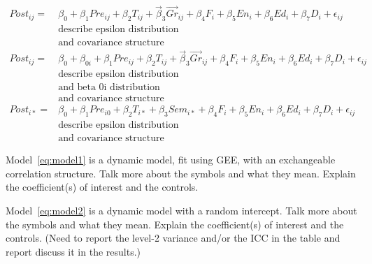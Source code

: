 \documentclass[a0,landscape]{a0poster}
\begin{document}
\begin{multicols}{3}
\begin{align}
\mathit{Post}_{ij} = & \beta_0 
                     + \beta_1 \mathit{Pre}_{ij}
                     + \beta_2 \mathit{T}_{ij}
                     + \vec\beta_{3} \overrightarrow{\mathit{Gr}}_{ij}
                     + \beta_4 \mathit{F}_{i}
                     + \beta_5 \mathit{En}_{i}
                     + \beta_6 \mathit{Ed}_{i}
                     + \beta_7 \mathit{D}_{i}
                     + \epsilon_{ij}
                     \label{eq:model1} \\
& \text{describe epsilon distribution} \nonumber \\
& \text{and covariance structure} \nonumber \\
\mathit{Post}_{ij} = & \beta_0 + \beta_{0i}
                     + \beta_1 \mathit{Pre}_{ij}
                     + \beta_2 \mathit{T}_{ij}
                     + \vec\beta_{3} \overrightarrow{\mathit{Gr}}_{ij}
                     + \beta_4 \mathit{F}_{i}
                     + \beta_5 \mathit{En}_{i}
                     + \beta_6 \mathit{Ed}_{i}
                     + \beta_7 \mathit{D}_{i}
                     + \epsilon_{ij}
                     \label{eq:model2} \\
& \text{describe epsilon distribution} \nonumber \\
& \text{and beta 0i distribution} \nonumber \\
& \text{and covariance structure} \nonumber \\
\mathit{Post}_{i*} = & \beta_0
                     + \beta_1 \mathit{Pre}_{i0}
                     + \beta_2 \mathit{T}_{i*}
                     + \beta_3 \mathit{Sem}_{i*}
                     + \beta_4 \mathit{F}_{i}
                     + \beta_5 \mathit{En}_{i}
                     + \beta_6 \mathit{Ed}_{i}
                     + \beta_7 \mathit{D}_{i}
                     + \epsilon_{ij}
                     \label{eq:model3} \\
& \text{describe epsilon distribution} \nonumber \\
& \text{and covariance structure} \nonumber
\end{align} 

Model~\ref{eq:model1} is a dynamic model, fit using GEE, with an exchangeable correlation structure.
Talk more about the symbols and what they mean.
Explain the coefficient(s) of interest and the controls.

Model~\ref{eq:model2} is a dynamic model with a random intercept.
Talk more about the symbols and what they mean.
Explain the coefficient(s) of interest and the controls.
(Need to report the level-2 variance and/or the ICC in the table
and report discuss it in the results.)


\end{multicols}
\end{document}
